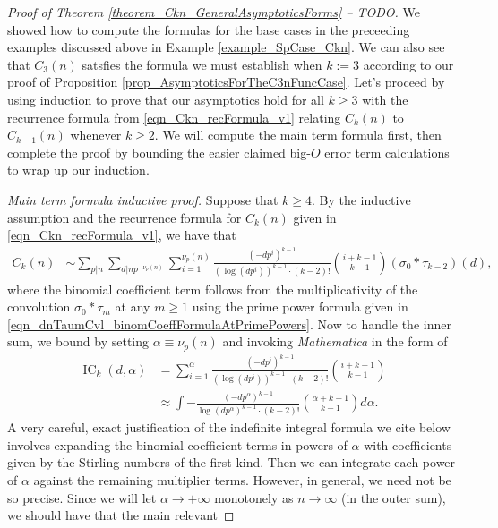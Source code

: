 \documentclass[11pt,reqno,a4letter]{article}
\numberwithin{figure}{section}
\numberwithin{table}{section}
\theoremstyle{plain}
\numberwithin{theorem}{section}
\theoremstyle{definition}
\newcommand{\NBRef}[1]{
     \todo[linecolor=green!85!white,backgroundcolor=orange!50!white,bordercolor=blue!30!black,textcolor=cyan!15!black,shadow,size=\small,fancyline]{
     \color{NBRefColor}{\textbf{#1}
     }
     }
}
\begin{document}
\begin{proof}[Proof of Theorem \ref{theorem_Ckn_GeneralAsymptoticsForms} -- TODO] 
We showed how to compute the formulas for the base cases in the preceeding examples 
discussed above in Example \ref{example_SpCase_Ckn}. 
We can also see that $C_3(n)$ satsfies the formula we must establish when $k := 3$ 
according to our proof of Proposition \ref{prop_AsymptoticsForTheC3nFuncCase}. 
Let's proceed by using induction to prove that our asymptotics hold for all 
$k \geq 3$ with the recurrence formula from 
\eqref{eqn_Ckn_recFormula_v1} 
relating $C_k(n)$ to $C_{k-1}(n)$ whenever $k \geq 2$. 
We will compute the main term formula first, then complete the proof 
by bounding the easier claimed big-$O$ error term calculations to wrap up our induction. 

\NBRef{A08-2020-04-26} 
\textit{Main term formula inductive proof.} 
Suppose that $k \geq 4$. By the inductive assumption and the 
recurrence formula for $C_k(n)$ given in \eqref{eqn_Ckn_recFormula_v1}, we have that 
\begin{align*} 
C_k(n) & \sim \sum_{p|n} \sum_{d|np^{-\nu_p(n)}} \sum_{i=1}^{\nu_p(n)} \frac{(-dp^i)^{k-1}}{(\log(dp^i))^{k-1} 
     \cdot (k-2)!} 
     \binom{i+k-1}{k-1} (\sigma_0 \ast \tau_{k-2})(d), 
\end{align*} 
where the binomial coefficient term follows from the multiplicativity of the convolution 
$\sigma_0 \ast \tau_m$ at any $m \geq 1$ 
using the prime power formula given in \eqref{eqn_dnTaumCvl_binomCoeffFormulaAtPrimePowers}. 
Now to handle the inner sum, we bound by setting $\alpha \equiv \nu_p(n)$ and 
invoking \emph{Mathematica} in the form of 
\begin{align*} 
\operatorname{IC}_k(d, \alpha) & = \sum_{i=1}^{\alpha} \frac{(-dp^i)^{k-1}}{(\log(dp^i))^{k-1} \cdot (k-2)!} 
     \binom{i+k-1}{k-1} \\ 
     & \approx \int -\frac{(-dp^{\alpha})^{k-1}}{\log(dp^{\alpha})^{k-1} \cdot (k-2)!} 
     \binom{\alpha+k-1}{k-1} d\alpha. 
\end{align*} 
A very careful, exact justification of the indefinite integral formula we cite below 
involves expanding the binomial coefficient terms in powers of $\alpha$ with 
coefficients given by the Stirling numbers of the first kind. 
Then we can integrate each power of $\alpha$ against the remaining multiplier terms. 
However, in general, we need not be so precise. Since we will let $\alpha \rightarrow +\infty$ 
monotonely as $n \rightarrow \infty$ (in the outer sum), we should have that the main relevant 

\end{proof}
\end{document}
